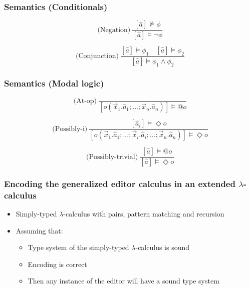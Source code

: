\documentclass[t,24pt,serif,aspectratio=169]{beamer}
\begin{document}
\begin{frame}
    \frametitle{Semantics (Conditionals)}
    \[
        \text{(Negation)} \ \frac{[\hat{a}] \not\models \phi}{[\hat{a}] \models \neg \phi}
    \]

    \[
        \text{(Conjunction)} \ \frac{[\hat{a}] \models \phi_1 \quad [\hat{a}] \models \phi_2}{[\hat{a}] \models \phi_1 \land \phi_2}
    \]

\end{frame}

\begin{frame}
    \frametitle{Semantics (Modal logic)}

    \[
        \text{(At-op)} \ \frac{}{[o(\vec{x}_1.\hat{a}_1;...;\vec{x}_n.\hat{a}_n)] \models @o}
    \]

    \[
        \text{(Possibly-i)} \ \frac{[\hat{a}_i] \models \Diamond o}{[o(\vec{x}_1.\hat{a}_1;...;\Vec{x}_i.\hat{a}_i;...;\vec{x}_n.\hat{a}_n)] \models \Diamond o}
    \]

    \[
        \text{(Possibly-trivial)} \ \frac{[\hat{a}] \models @o}{[\hat{a}] \models \Diamond o}
    \]

\end{frame}




\begin{frame}[hvid]
    \frametitle{Encoding the generalized editor calculus in an extended $\lambda$-calculus}
    \begin{itemize}
        \item Simply-typed $\lambda$-calculus with pairs, pattern matching and recursion
        \item Assuming that:
              \begin{itemize}
                  \item Type system of the simply-typed $\lambda$-calculus is sound
                  \item Encoding is correct
                  \item Then any instance of the editor will have a sound type system
              \end{itemize}
    \end{itemize}
\end{frame}
\end{document}
